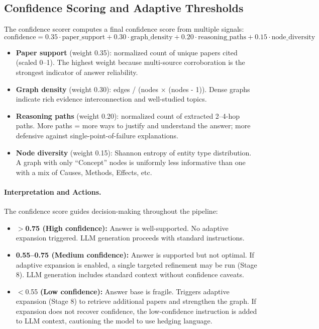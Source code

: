 \documentclass[11pt]{article}
\begin{document}
\subsection{Confidence Scoring and Adaptive Thresholds}

The confidence scorer computes a final confidence score from multiple signals:
\[
\text{confidence} = 0.35 \cdot \text{paper\_support} + 0.30 \cdot \text{graph\_density} + 0.20 \cdot \text{reasoning\_paths} + 0.15 \cdot \text{node\_diversity}
\]

\begin{itemize}[leftmargin=1.2em]
  \item \textbf{Paper support} (weight 0.35): normalized count of unique papers cited (scaled 0--1). The highest weight because multi-source corroboration is the strongest indicator of answer reliability.
  \item \textbf{Graph density} (weight 0.30): edges / (nodes × (nodes - 1)). Dense graphs indicate rich evidence interconnection and well-studied topics.
  \item \textbf{Reasoning paths} (weight 0.20): normalized count of extracted 2--4-hop paths. More paths = more ways to justify and understand the answer; more defensive against single-point-of-failure explanations.
  \item \textbf{Node diversity} (weight 0.15): Shannon entropy of entity type distribution. A graph with only ``Concept'' nodes is uniformly less informative than one with a mix of Causes, Methods, Effects, etc.
\end{itemize}

\paragraph{Interpretation and Actions.} The confidence score guides decision-making throughout the pipeline:

\begin{itemize}[leftmargin=1.2em]
  \item \textbf{$>$0.75 (High confidence):} Answer is well-supported. No adaptive expansion triggered. LLM generation proceeds with standard instructions.
  
  \item \textbf{0.55--0.75 (Medium confidence):} Answer is supported but not optimal. If adaptive expansion is enabled, a single targeted refinement may be run (Stage 8). LLM generation includes standard context without confidence caveats.
  
  \item $<$0.55 \textbf{(Low confidence):} Answer base is fragile. Triggers adaptive expansion (Stage 8) to retrieve additional papers and strengthen the graph. If expansion does not recover confidence, the low-confidence instruction is added to LLM context, cautioning the model to use hedging language.
\end{itemize}
\end{document}
